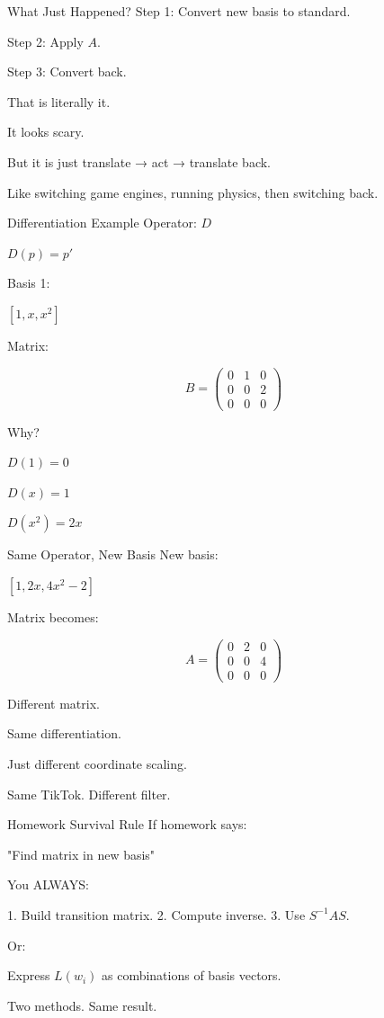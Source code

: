 \documentclass[landscape]{beamer}
\begin{document}
\begin{frame}{What Just Happened?}
Step 1: Convert new basis to standard.

Step 2: Apply $A$.

Step 3: Convert back.

That is literally it.

It looks scary.

But it is just
translate → act → translate back.

Like switching game engines,
running physics,
then switching back.
\end{frame}

\begin{frame}{Differentiation Example}
Operator: $D$

$D(p)=p'$

Basis 1:

$[1,x,x^2]$

Matrix:

\[
B=
\begin{pmatrix}
0&1&0\\
0&0&2\\
0&0&0
\end{pmatrix}
\]

Why?

$D(1)=0$

$D(x)=1$

$D(x^2)=2x$

\end{frame}

\begin{frame}{Same Operator, New Basis}
New basis:

$[1,2x,4x^2-2]$

Matrix becomes:

\[
A=
\begin{pmatrix}
0&2&0\\
0&0&4\\
0&0&0
\end{pmatrix}
\]

Different matrix.

Same differentiation.

Just different coordinate scaling.

Same TikTok.
Different filter.
\end{frame}

\begin{frame}{Homework Survival Rule}
If homework says:

"Find matrix in new basis"

You ALWAYS:

1. Build transition matrix.
2. Compute inverse.
3. Use $S^{-1}AS$.

Or:

Express $L(w_i)$
as combinations of basis vectors.

Two methods.
Same result.
\end{frame}
\end{document}
